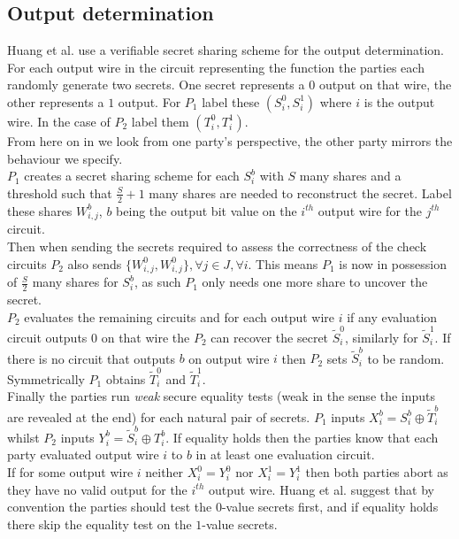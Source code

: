 \documentclass[ %
                    author={Nicholas Tutte},
                supervisor={Prof. Nigel Smart},
                    degree={MEng},
                     title={Secure Two Party Computation},
                  subtitle={A practical comparison of recent protocols},
                      type={Research - GG1K},
                      year={2015} ]{dissertation}
\begin{document}
			\subsection{Output determination}
				Huang et al. use a verifiable secret sharing scheme for the output determination. For each output wire in the circuit representing the function the parties each randomly generate two secrets. One secret represents a $0$ output on that wire, the other represents a $1$ output. For $P_1$ label these $(S_i^0, S_i^1)$ where $i$ is the output wire. In the case of $P_2$ label them $(T_i^0, T_i^1)$.\\

				From here on in we look from one party's perspective, the other party mirrors the behaviour we specify.\\

				$P_1$ creates a secret sharing scheme for each $S_i^b$ with $S$ many shares and a threshold such that $\frac{S}{2} + 1$ many shares are needed to reconstruct the secret. Label these shares $W_{i, j}^b$, $b$ being the output bit value on the $i^{th}$ output wire for the $j^{th}$ circuit.\\

				Then when sending the secrets required to assess the correctness of the check circuits $P_2$ also sends $\{W_{i, j}^0, W_{i, j}^0\}, \forall j \in J, \forall i$. This means $P_1$ is now in possession of $\frac{S}{2}$ many shares for $S_i^b$, as such $P_1$ only needs one more share to uncover the secret.\\

				$P_2$ evaluates the remaining circuits and for each output wire $i$ if any evaluation circuit outputs $0$ on that wire the $P_2$ can recover the secret $\tilde S_i^0$, similarly for $\tilde S_i^1$. If there is no circuit that outputs $b$ on output wire $i$ then $P_2$ sets $\tilde S_i^b$ to be random. Symmetrically $P_1$ obtains $\tilde T_i^0$ and $\tilde T_i^1$.\\

				Finally the parties run \emph{weak} secure equality tests (weak in the sense the inputs are revealed at the end) for each natural pair of secrets. $P_1$ inputs $X_i^b = S_i^b \oplus \tilde T_i^b$ whilst $P_2$ inputs $Y_i^b = \tilde S_i^b \oplus T_i^b$. If equality holds then the parties know that each party evaluated output wire $i$ to $b$ in at least one evaluation circuit.\\

				If for some output wire $i$ neither $X_i^0 = Y_i^0$ nor $X_i^1 = Y_i^1$ then both parties abort as they have no valid output for the $i^{th}$ output wire. Huang et al. suggest that by convention the parties should test the $0$-value secrets first, and if equality holds there skip the equality test on the $1$-value secrets.\\
\end{document}
